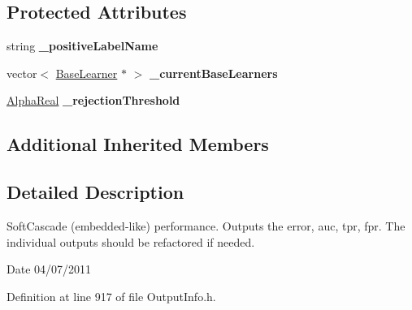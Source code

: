 \subsection*{Protected Attributes}
\begin{DoxyCompactItemize}
\item 
\hypertarget{classMultiBoost_1_1VJCascadeOutput_af7b1fa4b2f61db593c04b03fcbae4c55}{string {\bfseries \-\_\-positive\-Label\-Name}}\label{classMultiBoost_1_1VJCascadeOutput_af7b1fa4b2f61db593c04b03fcbae4c55}

\item 
\hypertarget{classMultiBoost_1_1VJCascadeOutput_a02e18e62cf9281fa59545837b0b92034}{vector$<$ \hyperlink{classMultiBoost_1_1BaseLearner}{Base\-Learner} $\ast$ $>$ {\bfseries \-\_\-current\-Base\-Learners}}\label{classMultiBoost_1_1VJCascadeOutput_a02e18e62cf9281fa59545837b0b92034}

\item 
\hypertarget{classMultiBoost_1_1VJCascadeOutput_a6a85dfa329680479c0be194c14b291f4}{\hyperlink{Defaults_8h_a80184c4fd10ab70a1a17c5f97dcd1563}{Alpha\-Real} {\bfseries \-\_\-rejection\-Threshold}}\label{classMultiBoost_1_1VJCascadeOutput_a6a85dfa329680479c0be194c14b291f4}

\end{DoxyCompactItemize}
\subsection*{Additional Inherited Members}


\subsection{Detailed Description}
Soft\-Cascade (embedded-\/like) performance. Outputs the error, auc, tpr, fpr. The individual outputs should be refactored if needed. \begin{DoxyDate}{Date}
04/07/2011 
\end{DoxyDate}


Definition at line 917 of file Output\-Info.\-h.



